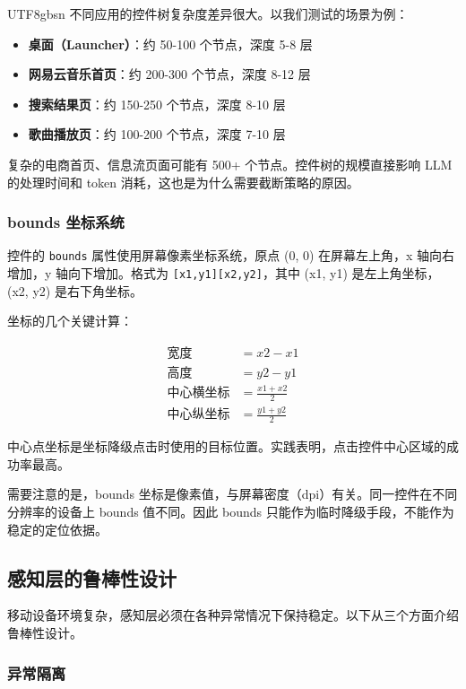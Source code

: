 \documentclass{article}
\begin{document}
\begin{CJK}{UTF8}{gbsn}
不同应用的控件树复杂度差异很大。以我们测试的场景为例：

\begin{itemize}
  \item \textbf{桌面（Launcher）}：约 50-100 个节点，深度 5-8 层
  \item \textbf{网易云音乐首页}：约 200-300 个节点，深度 8-12 层
  \item \textbf{搜索结果页}：约 150-250 个节点，深度 8-10 层
  \item \textbf{歌曲播放页}：约 100-200 个节点，深度 7-10 层
\end{itemize}

复杂的电商首页、信息流页面可能有 500+ 个节点。控件树的规模直接影响 LLM 的处理时间和 token 消耗，这也是为什么需要截断策略的原因。

\subsubsection{bounds 坐标系统}

控件的 \texttt{bounds} 属性使用屏幕像素坐标系统，原点 (0, 0) 在屏幕左上角，x 轴向右增加，y 轴向下增加。格式为 \texttt{[x1,y1][x2,y2]}，其中 (x1, y1) 是左上角坐标，(x2, y2) 是右下角坐标。

坐标的几个关键计算：

\begin{align}
  \text{宽度} &= x2 - x1 \\
  \text{高度} &= y2 - y1 \\
  \text{中心横坐标} &= \frac{x1 + x2}{2} \\
  \text{中心纵坐标} &= \frac{y1 + y2}{2}
\end{align}

中心点坐标是坐标降级点击时使用的目标位置。实践表明，点击控件中心区域的成功率最高。

需要注意的是，bounds 坐标是像素值，与屏幕密度（dpi）有关。同一控件在不同分辨率的设备上 bounds 值不同。因此 bounds 只能作为临时降级手段，不能作为稳定的定位依据。

\subsection{感知层的鲁棒性设计}

移动设备环境复杂，感知层必须在各种异常情况下保持稳定。以下从三个方面介绍鲁棒性设计。

\subsubsection{异常隔离}


\end{CJK}
\end{document}

